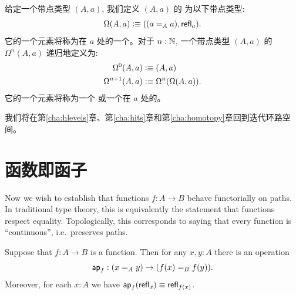 \begin{defn} \label{def:loopspace}
  给定一个带点类型 $(A,a)$, 我们定义 $(A,a)$ 的
  为以下带点类型:
  \[\Omega(A,a)\defeq ((\id[A]aa),\refl a).\]
  它的一个元素将称为在 $a$ 处的一个。对于 $n:\N$, 一个带点类型 $(A,a)$ 的 $\Omega^{n}(A,a)$
  递归地定义为:
  \begin{align*}
    \Omega^0(A,a)&\defeq(A,a)\\
    \Omega^{n+1}(A,a)&\defeq\Omega^n(\Omega(A,a)).
  \end{align*}
  它的一个元素将称为一个
  或一个在 $a$ 处的。
\end{defn}


我们将在第\ref{cha:hlevels}章、第\ref{cha:hits}章和第\ref{cha:homotopy}章回到迭代环路空间。
%
%

\section{函数即函子}
\label{sec:functors}

%
%
Now we wish to establish that functions $f:A\to B$ behave functorially on paths.
In traditional type theory, this is equivalently the statement that functions respect equality.
%
Topologically, this corresponds to saying that every function is ``continuous'', i.e.\ preserves paths.

\begin{lem}\label{lem:map}
  Suppose that $f:A\to B$ is a function.
  Then for any $x,y:A$ there is an operation
  \begin{equation*}
    \apfunc f : (\id[A] x y) \to (\id[B] {f(x)} {f(y)}).
  \end{equation*}
  Moreover, for each $x:A$ we have $\apfunc{f}(\refl{x})\jdeq \refl{f(x)}$.
\end{lem}


